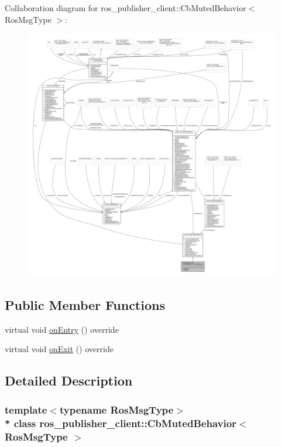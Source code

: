 Collaboration diagram for ros\+\_\+publisher\+\_\+client\+:\+:Cb\+Muted\+Behavior$<$ Ros\+Msg\+Type $>$\+:
\nopagebreak
\begin{figure}[H]
\begin{center}
\leavevmode
\includegraphics[width=350pt]{classros__publisher__client_1_1CbMutedBehavior__coll__graph}
\end{center}
\end{figure}
\subsection*{Public Member Functions}
\begin{DoxyCompactItemize}
\item 
virtual void \hyperlink{classros__publisher__client_1_1CbMutedBehavior_a080b2db7ff4aa25463423e4b0a8ee572}{on\+Entry} () override
\item 
virtual void \hyperlink{classros__publisher__client_1_1CbMutedBehavior_aad2c833afdc6f5d81f3ddce3c0f767e3}{on\+Exit} () override
\end{DoxyCompactItemize}


\subsection{Detailed Description}
\subsubsection*{template$<$typename Ros\+Msg\+Type$>$\\*
class ros\+\_\+publisher\+\_\+client\+::\+Cb\+Muted\+Behavior$<$ Ros\+Msg\+Type $>$}



